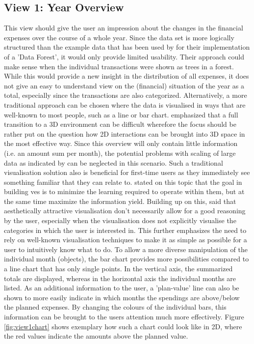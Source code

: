 
\subsection{View 1: Year Overview}

This view should give the user an impression about the changes in the financial expenses over the course of a whole year. Since the data set is more logically structured than the example data that has been used by \cite{Jamieson2007} for their implementation of a 'Data Forest', it would only provide limited usability. Their approach could make sense when the individual transactions were shown as trees in a forest. While this would provide a new insight in the distribution of all expenses, it does not give an easy to understand view on the (financial) situation of the year as a total, especially since the transactions are also categorized. \newline
Alternatively, a more traditional approach can be chosen where the data is visualised in ways that are well-known to most people, such as a line or bar chart. \cite{Drouhard2015} emphasized that a full transition to a 3D environment can be difficult wherefore the focus should be rather put on the question how 2D interactions can be brought into 3D space in the most effective way. Since this overview will only contain little information (i.e. an amount sum per month), the potential problems with scaling of large data as indicated by \cite{Jamieson2007} can be neglected in this scenario. Such a traditional visualisation solution also is beneficial for first-time users as they immediately see something familiar that they can relate to. \cite{Wann1996} stated on this topic that the goal in building \glspl{ve} is to minimize the learning required to operate within them, but at the same time maximize the information yield. Building up on this, \cite{Burlutskiy2014a} said that aesthetically attractive visualisation don't necessarily allow for a good reasoning by the user, especially when the visualisation does not explicitly visualise the categories in which the user is interested in. This further emphasizes the need to rely on well-known visualisation techniques to make it as simple as possible for a user to intuitively know what to do. \newline
To allow a more diverse manipulation of the individual month (objects), the bar chart provides more possibilities compared to a line chart that has only single points. In the vertical axis, the summarized totals are displayed, whereas in the horizontal axis the individual months are listed. As an additional information to the user, a 'plan-value' line can also be shown to more easily indicate in which months the spendings are above/below the planned expenses. By changing the colours of the individual bars, this information can be brought to the users attention much more effectively. Figure \ref{fig:view1chart} shows exemplary how such a chart could look like in 2D, where the red values indicate the amounts above the planned value.
